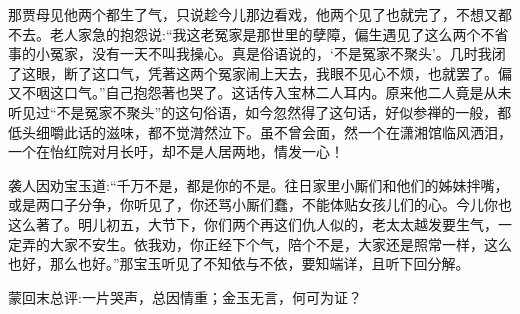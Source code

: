 \begin{parag}
    那贾母见他两个都生了气，只说趁今儿那边看戏，他两个见了也就完了，不想又都不去。老人家急的抱怨说:“我这老冤家是那世里的孽障，偏生遇见了这么两个不省事的小冤家，没有一天不叫我操心。真是俗语说的，‘不是冤家不聚头’。几时我闭了这眼，断了这口气，凭著这两个冤家闹上天去，我眼不见心不烦，也就罢了。偏又不咽这口气。”自己抱怨著也哭了。这话传入宝林二人耳内。原来他二人竟是从未听见过“不是冤家不聚头”的这句俗语，如今忽然得了这句话，好似参禅的一般，都低头细嚼此话的滋味，都不觉潸然泣下。虽不曾会面，然一个在潇湘馆临风洒泪，一个在怡红院对月长吁，却不是人居两地，情发一心！
\end{parag}


\begin{parag}
    袭人因劝宝玉道:“千万不是，都是你的不是。往日家里小厮们和他们的姊妹拌嘴，或是两口子分争，你听见了，你还骂小厮们蠢，不能体贴女孩儿们的心。今儿你也这么著了。明儿初五，大节下，你们两个再这们仇人似的，老太太越发要生气，一定弄的大家不安生。依我劝，你正经下个气，陪个不是，大家还是照常一样，这么也好，那么也好。”那宝玉听见了不知依与不依，要知端详，且听下回分解。
\end{parag}


\begin{parag}
    \begin{note}蒙回末总评:一片哭声，总因情重；金玉无言，何可为证？\end{note}
\end{parag}

